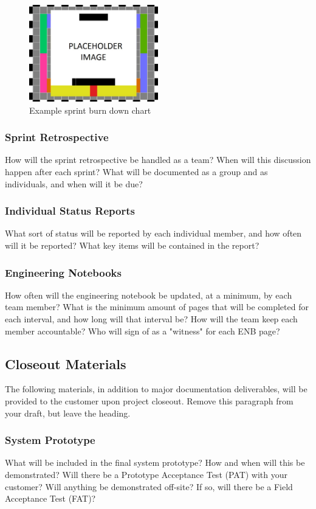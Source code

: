 \begin{figure}[h!]
    \centering
    \includegraphics[width=0.5\textwidth]{images/test_image}
    \caption{Example sprint burn down chart}
\end{figure}

\subsubsection{Sprint Retrospective}
How will the sprint retrospective be handled as a team? When will this discussion happen after each sprint? What will be documented as a group and as individuals, and when will it be due?

\subsubsection{Individual Status Reports}
What sort of status will be reported by each individual member, and how often will it be reported? What key items will be contained in the report?

\subsubsection{Engineering Notebooks}
How often will the engineering notebook be updated, at a minimum, by each team member? What is the minimum amount of pages that will be completed for each interval, and how long will that interval be? How will the team keep each member accountable? Who will sign of as a "witness" for each ENB page?

\subsection{Closeout Materials}
The following materials, in addition to major documentation deliverables, will be provided to the customer upon project closeout. Remove this paragraph from your draft, but leave the heading.

\subsubsection{System Prototype}
What will be included in the final system prototype? How and when will this be demonstrated? Will there be a Prototype Acceptance Test (PAT) with your customer? Will anything be demonstrated off-site? If so, will there be a Field Acceptance Test (FAT)?

